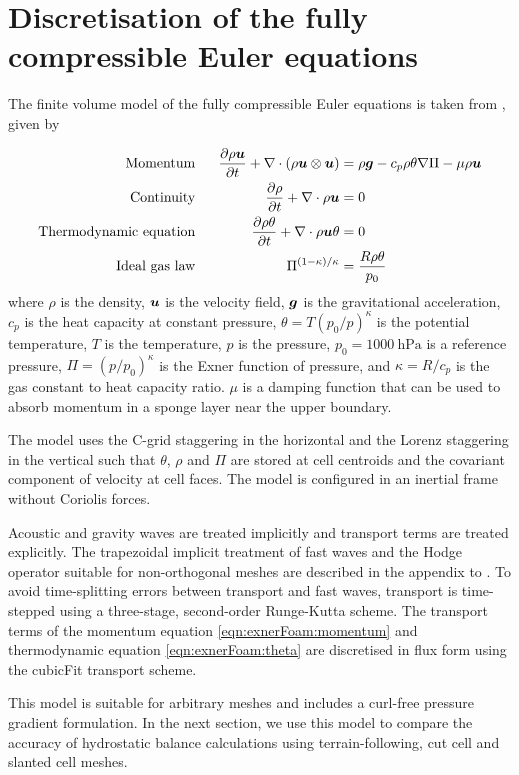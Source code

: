 \section{Discretisation of the fully compressible Euler equations}
\label{sec:slanted:exnerFoamH}

The finite volume model of the fully compressible Euler equations is taken from \citet{weller-shahrokhi2014}, given by

\begin{subequations}
\begin{align}
	\text{Momentum} &\ &\  	\frac{\partial \rho \vect{u}}{\partial t} + \nabla \cdot \left( \rho \vect{u}\otimes\vect{u} \right) &= \rho \vect{g} - c_p \rho \theta \nabla \Pi - \mu \rho \vect{u} \label{eqn:exnerFoam:momentum} \\
	\text{Continuity} &\ &\	\frac{\partial \rho}{\partial t} + \nabla \cdot \rho \vect{u} &= 0 \label{eqn:exnerFoam:cont} \\
	\text{Thermodynamic equation} &\ &\ \frac{\partial \rho \theta}{\partial t} + \nabla \cdot \rho \vect{u} \theta &= 0 \label{eqn:exnerFoam:theta} \\
	\text{Ideal gas law} &\ &\ \Pi^{(1 - \kappa)/\kappa} &= \frac{R \rho \theta}{p_0} \label{eqn:exnerFoam:state}
\end{align}
\end{subequations}
where \(\rho\) is the density, \(\bm{u}\) is the velocity field, \(\bm{g}\) is the gravitational acceleration, \(c_p\) is the heat capacity at constant pressure, \(\theta = T \left(p_0/p\right)^\kappa\) is the potential temperature, \(T\) is the temperature, \(p\) is the pressure, \(p_0 = \SI{1000}{\hecto\pascal}\) is a reference pressure, \(\Pi = \left(p / p_0 \right)^\kappa\) is the Exner function of pressure, and \(\kappa = R/c_p\) is the gas constant to heat capacity ratio.  \(\mu\) is a damping function that can be used to absorb momentum in a sponge layer near the upper boundary.

The model uses the C-grid staggering in the horizontal and the Lorenz staggering in the vertical such that $\theta$, $\rho$ and $\Pi$ are stored at cell centroids and the covariant component of velocity at cell faces.  The model is configured in an inertial frame without Coriolis forces.

Acoustic and gravity waves are treated implicitly and transport terms are treated explicitly.
The trapezoidal implicit treatment of fast waves and the Hodge operator suitable for non-orthogonal meshes are described in the appendix to \citet{shaw-weller2016}.
To avoid time-splitting errors between transport and fast waves, transport is time-stepped using a three-stage, second-order Runge-Kutta scheme.
The transport terms of the momentum equation \eqref{eqn:exnerFoam:momentum} and thermodynamic equation \eqref{eqn:exnerFoam:theta} are discretised in flux form using the cubicFit transport scheme.

This model is suitable for arbitrary meshes and includes a curl-free pressure gradient formulation.
In the next section, we use this model to compare the accuracy of hydrostatic balance calculations using terrain-following, cut cell and slanted cell meshes.
